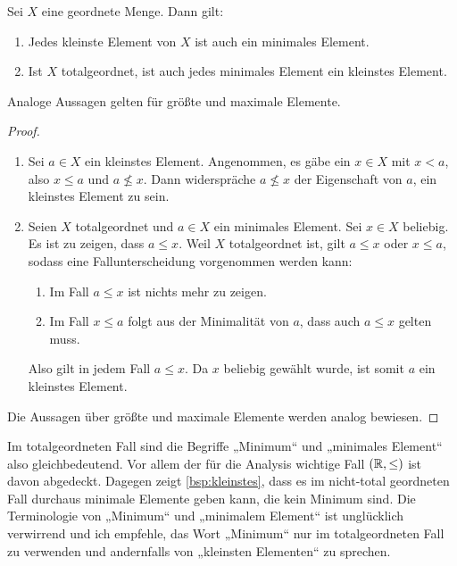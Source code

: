 \begin{satz} \label{kleinvsmin}
    Sei $X$ eine geordnete Menge. Dann gilt:
    \begin{enumerate}
        \item Jedes kleinste Element von $X$ ist auch ein minimales Element.
        \item Ist $X$ totalgeordnet, ist auch jedes minimales Element ein kleinstes Element.
    \end{enumerate}
    Analoge Aussagen gelten für größte und maximale Elemente.
\end{satz}
\begin{proof}
    \quad
    \begin{enumerate}
        \item Sei $a\in X$ ein kleinstes Element. Angenommen, es gäbe ein $x\in X$ mit $x<a$, also $x\le a$ und $a\not\le x$. Dann widerspräche $a\not\le x$ der Eigenschaft von $a$, ein kleinstes Element zu sein.
        \item Seien $X$ totalgeordnet und $a\in X$ ein minimales Element. Sei $x\in X$ beliebig. Es ist zu zeigen, dass $a\le x$. Weil $X$ totalgeordnet ist, gilt $a\le x$ oder $x\le a$, sodass eine Fallunterscheidung vorgenommen werden kann:
        \begin{enumerate}[1)]
            \item Im Fall $a\le x$ ist nichts mehr zu zeigen.
            \item Im Fall $x\le a$ folgt aus der Minimalität von $a$, dass auch $a\le x$ gelten muss.
        \end{enumerate}
        Also gilt in jedem Fall $a\le x$. Da $x$ beliebig gewählt wurde, ist somit $a$ ein kleinstes Element.
    \end{enumerate}
    Die Aussagen über größte und maximale Elemente werden analog bewiesen.
\end{proof}


\begin{bem}
    Im totalgeordneten Fall sind die Begriffe „Minimum“ und „minimales Element“ also gleichbedeutend. Vor allem der für die Analysis wichtige Fall $(\mathbb R,\le)$ ist davon abgedeckt. Dagegen zeigt \cref{bsp:kleinstes}, dass es im nicht-total geordneten Fall durchaus minimale Elemente geben kann, die kein Minimum sind. Die Terminologie von „Minimum“ und „minimalem Element“ ist unglücklich verwirrend und ich empfehle, das Wort „Minimum“ nur im totalgeordneten Fall zu verwenden und andernfalls von „kleinsten Elementen“ zu sprechen.
\end{bem}


